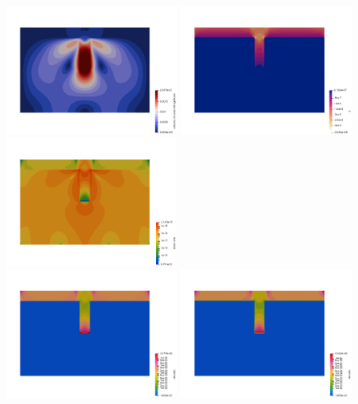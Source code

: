 \begin{center}
\includegraphics[width=5.7cm]{python_codes/fieldstone_87/results/experiment_03/100x66_N/vel.png}
\includegraphics[width=5.7cm]{python_codes/fieldstone_87/results/experiment_03/100x66_N/p.png}
\includegraphics[width=5.7cm]{python_codes/fieldstone_87/results/experiment_03/100x66_N/sr.png}\\
\includegraphics[width=5.7cm]{python_codes/fieldstone_87/results/experiment_03/100x66_N/eta.png}
\includegraphics[width=5.7cm]{python_codes/fieldstone_87/results/experiment_03/100x66_N/etan.png}

\end{center}
